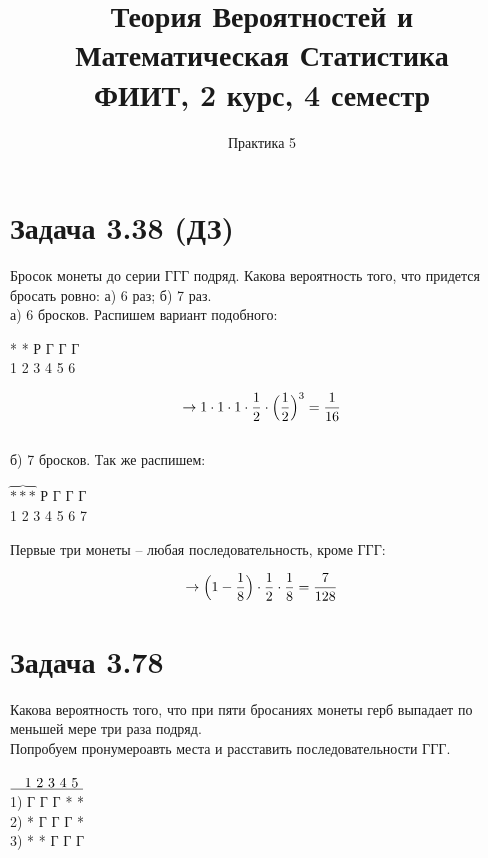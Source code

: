 \documentclass{article}
\title{Теория Вероятностей и Математическая Статистика\\
ФИИТ, 2 курс, 4 семестр}
\author{Практика 5}
\begin{document}
\maketitle


\section{Задача 3.38 (ДЗ)}

Бросок монеты до серии ГГГ подряд. Какова вероятность того, что придется бросать ровно: а) 6 раз; б) 7 раз.
\\

а) 6 бросков. Распишем вариант подобного:

\begin{center}
* * Р Г Г Г\\
1 2 3 4 5 6
\end{center}

$$\rightarrow 1 \cdot 1 \cdot 1 \cdot \frac{1}{2}
\cdot \Bigl(\frac{1}{2}\Bigr)^3 = \frac{1}{16}$$
\\

б) 7 бросков. Так же распишем:

\begin{center}
$\overbrace{* * *}$ Р Г Г Г\\
1 2 3 4 5 6 7
\end{center}

Первые три монеты -- любая последовательность, кроме ГГГ:

$$\rightarrow \Bigl(1 - \frac{1}{8}\Bigr) \cdot \frac{1}{2} \cdot \frac{1}{8} =  \frac{7}{128} $$

\section{Задача 3.78}

Какова вероятность того, что при пяти бросаниях монеты герб выпадает по меньшей мере три раза подряд.
\\

Попробуем пронумероавть места и расставить последовательности ГГГ.

\begin{center}
$\underline{\text{\quad1 2 3 4 5 }}$\\
1) Г Г Г * * \\
2) * Г Г Г *\\
3) * * Г Г Г
\end{center}
\end{document}
